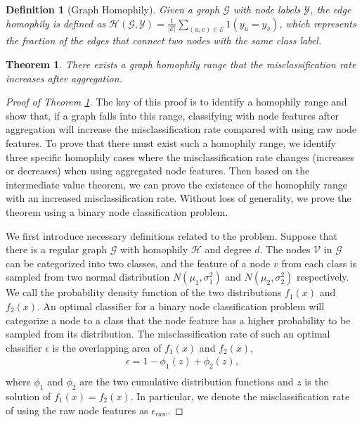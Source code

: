 \documentclass{article}
\theoremstyle{plain}
\newtheorem{definition}{Definition}[section]
\newtheorem{theorem}{Theorem}
\begin{document}
\begin{definition}[Graph Homophily] \label{def:Homophily}
Given a graph $\mathcal{G}$ with node labels $\mathcal{Y}$, the edge homophily is defined as
$\mathcal{H}(\mathcal{G},\mathcal{Y})=\frac{1}{|\mathcal{E}|}\sum_{(u,v) \in \mathcal{E}} \mathrm{}{1}(y_u=y_v)$, which represents the fraction of the edges that connect two nodes with the same class label.
\end{definition}

\begin{theorem} \label{thm:misclassification}
There exists a graph homophily range that the misclassification rate increases after aggregation.
\end{theorem}
\vspace{-10pt}
\begin{proof}[Proof of Theorem \ref{thm:misclassification}] 
The key of this proof is to identify a homophily range and show that, if a graph falls into this range, classifying with node features after aggregation will increase the misclassification rate compared with using raw node features. 
To prove that there must exist such a homophily range, we identify three specific homophily cases where the misclassification rate changes (increases or decreases) when using aggregated node features. Then based on the intermediate value theorem, we can prove the existence of the homophily range with an increased misclassification rate.
Without loss of generality, we prove the theorem using a binary node classification problem. 


We first introduce necessary definitions related to the problem.
Suppose that there is a regular graph $\mathcal{G}$ with homophily $\mathcal{H}$ and degree $d$. The nodes $\mathcal{V}$ in $\mathcal{G}$ can be categorized into two classes, and the feature of a node $v$ from each class is sampled from two normal distribution $N(\mu_{1},\sigma_{1}^{2})$ and $N(\mu_{2},\sigma_{2}^{2})$ respectively. We call the probability density function of the two distributions $f_1(x)$ and $f_2(x)$.
An optimal classifier for a binary node classification problem will categorize a node to a class that the node feature has a higher probability to be sampled from its distribution. 
The misclassification rate of such an optimal classifier $\epsilon$ is the overlapping area of $f_1(x)$ and $f_2(x)$,
\begin{equation}
\begin{aligned}
\epsilon = 1 - \phi_1(z) + \phi_2(z), \\
\end{aligned}
\label{eq:misrate}
\end{equation}
where $\phi_1$ and $\phi_2$ are the two cumulative distribution functions and $z$ is the solution of $f_1(x)=f_2(x)$. In particular, we denote the misclassification rate of using the raw node features as $\epsilon_{raw}$.



\end{proof}
\end{document}
